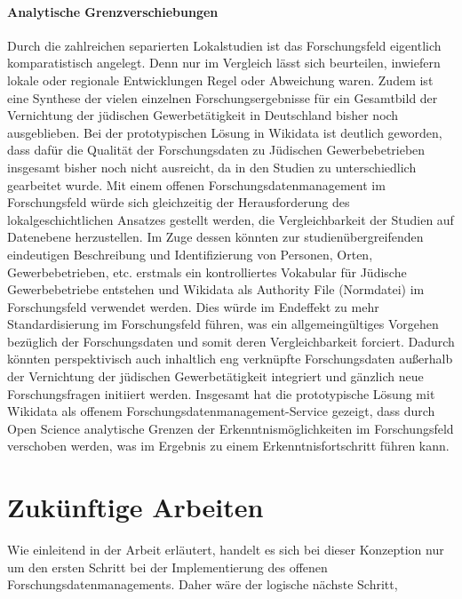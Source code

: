 \paragraph{Analytische Grenzverschiebungen} Durch die zahlreichen separierten Lokalstudien ist das Forschungsfeld eigentlich komparatistisch angelegt. Denn nur im Vergleich lässt sich beurteilen, inwiefern lokale oder regionale Entwicklungen Regel oder Abweichung waren. Zudem ist eine Synthese der vielen einzelnen Forschungsergebnisse für ein Gesamtbild der Vernichtung der jüdischen Gewerbetätigkeit in Deutschland bisher noch ausgeblieben. Bei der prototypischen Lösung in Wikidata ist deutlich geworden, dass dafür die Qualität der Forschungsdaten zu Jüdischen Gewerbebetrieben insgesamt bisher noch nicht ausreicht, da in den Studien zu unterschiedlich gearbeitet wurde. Mit einem offenen Forschungsdatenmanagement im Forschungsfeld würde sich gleichzeitig der Herausforderung des lokalgeschichtlichen Ansatzes gestellt werden, die Vergleichbarkeit der Studien auf Datenebene herzustellen. Im Zuge dessen könnten zur studienübergreifenden eindeutigen Beschreibung und Identifizierung von Personen, Orten, Gewerbebetrieben, etc. erstmals ein kontrolliertes Vokabular für Jüdische Gewerbebetriebe entstehen und Wikidata als Authority File (Normdatei) im Forschungsfeld verwendet werden. Dies würde im Endeffekt zu mehr Standardisierung im Forschungsfeld führen, was ein allgemeingültiges Vorgehen bezüglich der Forschungsdaten und somit deren Vergleichbarkeit forciert. Dadurch könnten perspektivisch auch inhaltlich eng verknüpfte Forschungsdaten außerhalb der Vernichtung der jüdischen Gewerbetätigkeit integriert und gänzlich neue Forschungsfragen initiiert werden. Insgesamt hat die prototypische Lösung mit Wikidata als offenem Forschungsdatenmanagement-Service gezeigt, dass durch Open Science analytische Grenzen der Erkenntnismöglichkeiten im Forschungsfeld verschoben werden, was im Ergebnis zu einem Erkenntnisfortschritt führen kann.

\section{Zukünftige Arbeiten}

Wie einleitend in der Arbeit erläutert, handelt es sich bei dieser Konzeption nur um den ersten Schritt bei der Implementierung des offenen Forschungsdatenmanagements. Daher wäre der logische nächste Schritt,